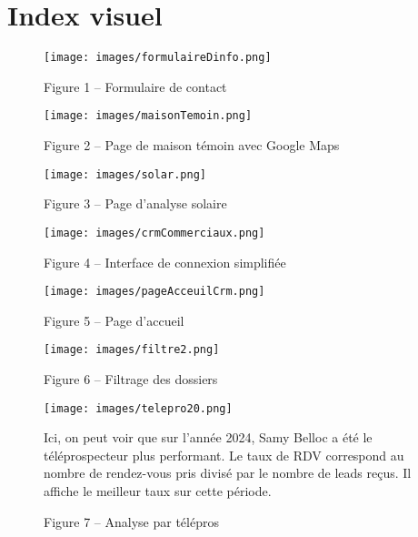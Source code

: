 \section*{Index visuel}

\begin{figure}[H]
    \centering
    \texttt{[image: images/formulaireDinfo.png]}
    \caption*{Figure 1 – Formulaire de contact}
\label{fig:formulaire-contact}
\end{figure}

\begin{figure}[H]
    \centering
    \texttt{[image: images/maisonTemoin.png]}
    \caption*{Figure 2 – Page de maison témoin avec Google Maps}
    \label{fig:maison-temoin}
\end{figure}

\begin{figure}[H]
    \centering
    \texttt{[image: images/solar.png]}
    \label{fig:analyse-solaire}
    \caption*{Figure 3 – Page d’analyse solaire}
\end{figure}

\newpage

\begin{figure}[H]
    \centering
    \texttt{[image: images/crmCommerciaux.png]}
    \caption*{Figure 4 – Interface de connexion simplifiée}
    \label{fig:connexion-crm}
\end{figure}

\begin{figure}[H]
    \centering
    \texttt{[image: images/pageAcceuilCrm.png]}
    \caption*{Figure 5 – Page d'accueil}
    \label{fig:page-accueil}
\end{figure}

\begin{figure}[H]
    \centering
    \texttt{[image: images/filtre2.png]}
    \caption*{Figure 6 – Filtrage des dossiers}
    \label{fig:filtrage}
\end{figure}

\newpage

\begin{figure}[H]
    \centering
    \texttt{[image: images/telepro20.png]}
    \caption*{Figure 7 – Analyse par télépros}

    \label{fig:analyse-telepros}
    \vspace{0.5em}
        {\small
        Ici, on peut voir que sur l’année 2024, Samy Belloc a été le téléprospecteur plus performant.
        Le taux de RDV correspond au nombre de rendez-vous pris divisé par le nombre de leads reçus.
        Il affiche le meilleur taux sur cette période.

        }
\end{figure}


